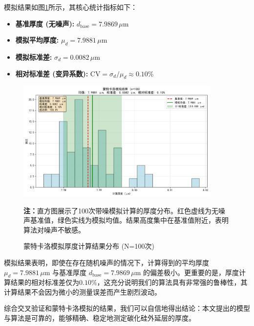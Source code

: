 \documentclass[withoutpreface,bwprint]{cumcmthesis} %
\begin{document}
\newcommand{\baseThickness}{7.9869} %
\newcommand{\meanThickness}{7.9881} %
\newcommand{\stdThickness}{0.0082}  %
\newcommand{\relativeStd}{0.10}   %

模拟结果如图\ref{fig:monte-carlo}所示，其核心统计指标如下：
\begin{itemize}
    \item \textbf{基准厚度 (无噪声):} $d_{\text{base}} = \baseThickness \, \mu\text{m}$
    \item \textbf{模拟平均厚度:} $\mu_d = \meanThickness \, \mu\text{m}$
    \item \textbf{模拟标准差:} $\sigma_d = \stdThickness \, \mu\text{m}$
    \item \textbf{相对标准差 (变异系数):} $\text{CV} = \sigma_d / \mu_d \approx \relativeStd\%$
\end{itemize}

\begin{figure}[htbp]
    \centering
    \includegraphics[width=0.9\textwidth]{figures/monte_carlo_result.png}
    \caption{蒙特卡洛模拟厚度计算结果分布 (N=100次)}
    \label{fig:monte-carlo}
    \textbf{注：}直方图展示了100次带噪模拟计算的厚度分布。红色虚线为无噪声基准值，绿色实线为模拟均值。结果高度集中在基准值附近，表明算法对噪声不敏感。
\end{figure}

模拟结果表明，即使在存在随机噪声的情况下，计算得到的平均厚度 $\mu_d = \meanThickness \, \mu\text{m}$ 与基准厚度 $d_{\text{base}} = \baseThickness \, \mu\text{m}$ 的偏差极小。更重要的是，厚度计算结果的相对标准差仅为$\relativeStd\%$，这充分说明我们的算法具有非常强的鲁棒性，其计算结果不会因为微小的测量误差而产生剧烈波动。

综合交叉验证和蒙特卡洛模拟的结果，我们可以自信地得出结论：本文提出的模型与算法是可靠的，能够精确、稳定地测定碳化硅外延层的厚度。
\end{document}
